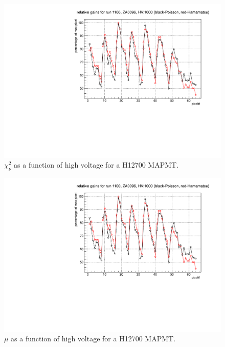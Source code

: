 \documentclass[prc,twocolumn]{revtex4}
\begin{document}
	\begin{figure}
		\includegraphics[width=1.0\linewidth,page=3]{hamamatsu.pdf}
		\caption{$\chi^{2}_{\nu}$ as a function of high voltage for a H12700 MAPMT.}
		\label{chi2hv}
	\end{figure}
	\begin{figure}
		\includegraphics[width=1.0\linewidth,page=4]{hamamatsu.pdf}
		\caption{$\mu$ as a function of high voltage for a H12700 MAPMT.}
		\label{muhv}
	\end{figure}
\end{document}
